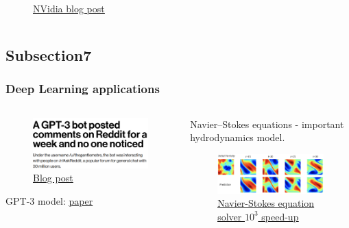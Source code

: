 \documentclass[10pt, xcolor=x11names,compress]{beamer}
\begin{document}
\begin{frame}
\begin{columns}
\begin{column}{0.5\textwidth}
\begin{figure}
				\caption{\href{https://news.developer.nvidia.com/ai-can-generate-synthetic-mris-to-advance-medical-research/}{{\color{blue}\underline{NVidia blog post}}}}
			\end{figure}
		\end{column}
	\end{columns}
\end{frame}

\subsection{Subsection7}
\begin{frame}\frametitle{Deep Learning applications}
	\begin{columns}
	\begin{column}{0.5\textwidth}
		\begin{figure}
			\centering
			\includegraphics[height=.3\textheight]{images/reddit.png}
			\caption{\href{https://www.technologyreview.com/2020/10/08/1009845/a-gpt-3-bot-posted-comments-on-reddit-for-a-week-and-no-one-noticed/}{{\color{blue}\underline{Blog post}}}}
		\end{figure}
	GPT-3 model: \href{https://arxiv.org/abs/2005.14165}{{\color{blue}\underline{paper}}}
	\end{column}
	\begin{column}{0.5\textwidth}
		Navier–Stokes equations - important hydrodynamics model.
		\begin{figure}
			\centering
			\includegraphics[height=.32\textheight]{images/navie.png}
			\caption{\href{https://arxiv.org/abs/2010.08895}{{\color{blue}\underline{Navier-Stokes equation solver $10^3$ speed-up}}}}
		\end{figure}
	\end{column}
\end{columns}
\end{frame}
\end{document}
